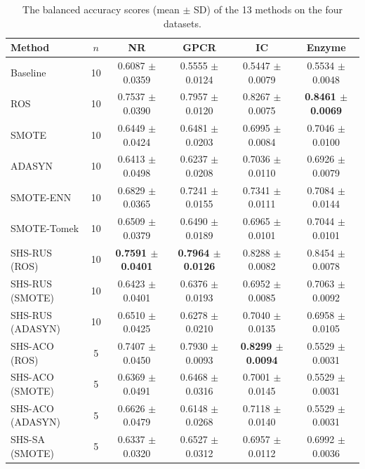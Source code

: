 \documentclass[pdflatex,sn-basic]{sn-jnl}
\begin{document}
\begin{appendices}
\begin{table}[htbp]
\centering
\caption{The balanced accuracy scores (mean $\pm$ SD) of the 13 methods on the four datasets.}
\label{tab:sbas}
\setlength{\tabcolsep}{3pt}%
\footnotesize
\begin{tabular}{lccccc}
\toprule
Method & $n$ & NR & GPCR & IC & Enzyme \\
\midrule
Baseline & 10 & 0.6087 $\pm$ 0.0359 & 0.5555 $\pm$ 0.0124 & 0.5447 $\pm$ 0.0079 & 0.5534 $\pm$ 0.0048 \\
ROS & 10 & 0.7537 $\pm$ 0.0390 & 0.7957 $\pm$ 0.0120 & 0.8267 $\pm$ 0.0075 & \textbf{0.8461 $\pm$ 0.0069} \\
SMOTE & 10 & 0.6449 $\pm$ 0.0424 & 0.6481 $\pm$ 0.0203 & 0.6995 $\pm$ 0.0084 & 0.7046 $\pm$ 0.0100 \\
ADASYN & 10 & 0.6413 $\pm$ 0.0498 & 0.6237 $\pm$ 0.0208 & 0.7036 $\pm$ 0.0110 & 0.6926 $\pm$ 0.0079 \\
SMOTE-ENN & 10 & 0.6829 $\pm$ 0.0365 & 0.7241 $\pm$ 0.0155 & 0.7341 $\pm$ 0.0111 & 0.7084 $\pm$ 0.0144 \\
SMOTE-Tomek & 10 & 0.6509 $\pm$ 0.0379 & 0.6490 $\pm$ 0.0189 & 0.6965 $\pm$ 0.0101 & 0.7044 $\pm$ 0.0101 \\
SHS-RUS (ROS) & 10 & \textbf{0.7591 $\pm$ 0.0401} & \textbf{0.7964 $\pm$ 0.0126} & 0.8288 $\pm$ 0.0082 & 0.8454 $\pm$ 0.0078 \\
SHS-RUS (SMOTE) & 10 & 0.6423 $\pm$ 0.0401 & 0.6376 $\pm$ 0.0193 & 0.6952 $\pm$ 0.0085 & 0.7063 $\pm$ 0.0092 \\
SHS-RUS (ADASYN) & 10 & 0.6510 $\pm$ 0.0425 & 0.6278 $\pm$ 0.0210 & 0.7040 $\pm$ 0.0135 & 0.6958 $\pm$ 0.0105 \\
SHS-ACO (ROS) & 5 & 0.7407 $\pm$ 0.0450 & 0.7930 $\pm$ 0.0093 & \textbf{0.8299 $\pm$ 0.0094} & 0.5529 $\pm$ 0.0031 \\
SHS-ACO (SMOTE) & 5 & 0.6369 $\pm$ 0.0491 & 0.6468 $\pm$ 0.0316 & 0.7001 $\pm$ 0.0145 & 0.5529 $\pm$ 0.0031 \\
SHS-ACO (ADASYN) & 5 & 0.6626 $\pm$ 0.0479 & 0.6148 $\pm$ 0.0268 & 0.7118 $\pm$ 0.0140 & 0.5529 $\pm$ 0.0031 \\
SHS-SA (SMOTE) & 5 & 0.6337 $\pm$ 0.0320 & 0.6527 $\pm$ 0.0312 & 0.6957 $\pm$ 0.0112 & 0.6992 $\pm$ 0.0036 \\
\bottomrule
\end{tabular}
\end{table}


\end{appendices}
\end{document}
